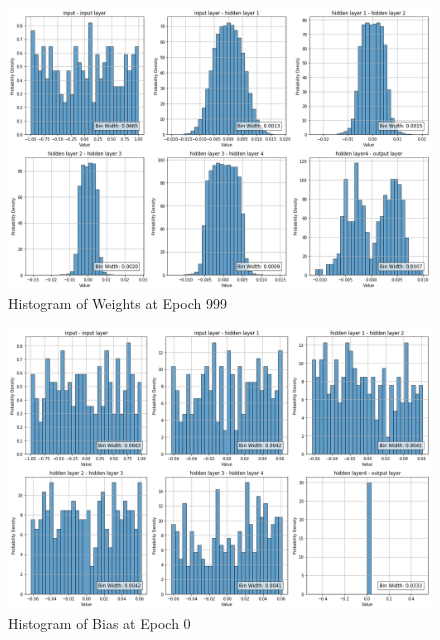 \documentclass{ioereport}
\begin{document}
    \begin{figure}[H]
        \centering
        \includegraphics[width=\linewidth]{assets/audio histogram/epoch999Weight.png}
        \caption{Histogram of Weights at Epoch 999}
        \label{fig:audio-weight-999}
    \end{figure}


    \begin{figure}[H]
        \centering
        \includegraphics[width=\linewidth]{assets/audio histogram/epoch0Bias.png}
        \caption{Histogram of Bias at Epoch 0}
        \label{fig:audio-bias-0}
    \end{figure}
\end{document}
